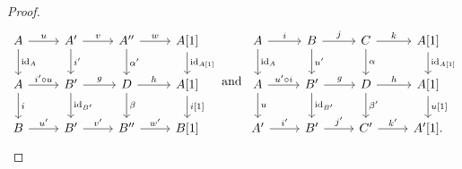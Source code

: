\documentclass[dissertation.tex]{subfiles}
\begin{document}
\begin{prop}
\begin{proof}
    $$\begin{tikzcd}
      A \arrow{r}{u}\arrow{d}{\id_A} & A^\prime \arrow{r}{v}\arrow{d}{i^\prime} & A^{\prime\prime} \arrow{r}{w}\arrow{d}{\alpha^\prime} & A[1] \arrow{d}{\id_{A[1]}}\\
      A \arrow{r}{i^\prime \circ u} \arrow{d}{i} & B^\prime \arrow{r}{g}\arrow{d}{\id_{B^\prime}} & D \arrow{r}{h}\arrow{d}{\beta} & A[1]\arrow{d}{i[1]}\\
      B \arrow{r}{u^\prime} & B^\prime \arrow{r}{v^\prime} & B^{\prime\prime} \arrow{r}{w^\prime} & B[1]
    \end{tikzcd}
    \ \text{and}\ 
    \begin{tikzcd}
      A \arrow{r}{i} \arrow{d}{\id_A} & B \arrow{r}{j}\arrow{d}{u^\prime} & C \arrow{r}{k}\arrow{d}{\alpha} & A[1]\arrow{d}{\id_{A[1]}}\\
      A \arrow{r}{u^\prime \circ i}\arrow{d}{u} & B^\prime \arrow{r}{g}\arrow{d}{\id_{B^\prime}} & D \arrow{r}{h}\arrow{d}{\beta^\prime} & A[1]\arrow{d}{u[1]}\\
      A^\prime \arrow{r}{i^\prime} & B^\prime \arrow{r}{j^\prime} & C^\prime \arrow{r}{k^\prime} & A^\prime[1].
    \end{tikzcd}$$


\end{proof}
\end{prop}
\end{document}
